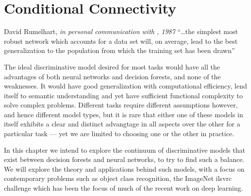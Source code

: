 \documentclass[thesis]{subfiles}
\begin{document}
	\chapter{Conditional Connectivity}\label{conditionalnetworks}
	\begin{chapquote}{David Rumelhart, \textit{in personal communication with \citeauthor{hanson1989comparing}, 1987}}
		``\ldots the simplest most robust network which accounts for a data set will, on average, lead to the best generalization to the population from which the training set has been drawn''
	\end{chapquote}
	
	The ideal discriminative model desired for most tasks would have all the advantages of both neural networks and decision forests, and none of the weaknesses. It would have good generalization with computational efficiency, lend itself to semantic understanding and yet have sufficient functional complexity to solve complex problems. Different tasks require different assumptions however, and hence different model types, but it is rare that either one of these models in itself exhibits a clear and distinct advangtage in all aspects over the other for a particular task --- yet we are limited to choosing one or the other in practice.
	
	In this chapter we intend to explore the continuum of discriminative models that exist between decision forests and neural networks, to try to find such a balance. We will explore the theory and applications behind such models, with a focus on contemporary problems such as object class recognition, \ie the ImageNet \gls{ilsvrc} challenge which has been the focus of much of the recent work on deep learning.
	
\end{document}
